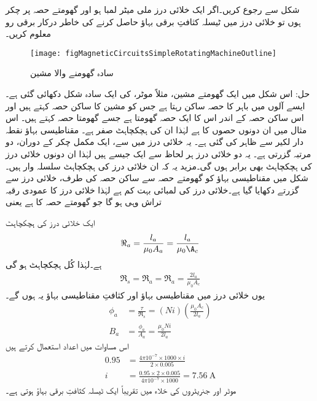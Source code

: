 %
شکل   سے رجوع کریں۔اگر ایک خلائی درز  ملی میٹر لمبا ہو اور گھومتے حصہ پر  چکر ہوں تو خلائی درز میں  ٹیسلہ کثافتِ برقی بہاؤ حاصل کرنے کی خاطر درکار برقی رو معلوم کریں۔
\begin{figure}
\centering
\texttt{[image: figMagneticCircuitsSimpleRotatingMachineOutline]}
\caption{سادہ گھومنے والا مشین}
\label{شکل_مقناطیسی_دور_سادہ_گھومتا_مشین}
\end{figure}
حل:
	 اس شکل میں ایک گھومتے مشین، مثلاً موٹر، کی ایک سادہ شکل دکھائی گئی ہے۔ ایسے آلوں میں باہر کا حصہ ساکن رہتا ہے جس کو مشین کا ساکن حصہ کہتے ہیں اور اس ساکن حصہ کے اندر اس کا ایک حصہ گھومتا ہے جسے گھومتا حصہ کہتے ہیں۔ اس مثال میں ان دونوں حصوں کا    ہے لہٰذا ان کی ہچکچاہٹ صفر ہے۔ مقناطیسی بہاؤ نقطہ دار لکیر سے ظاہر کی گئی ہے۔ یہ خلائی درز میں سے، ایک مکمل چکر کے دوران، دو مرتبہ گزرتی ہے۔ یہ دو خلائی درز ہر لحاظ سے ایک جیسے ہیں لہٰذا ان دونوں خلائی درز کی ہچکچاہٹ بھی برابر ہوں گی۔مزید یہ کہ ان خلائی درز کی ہچکچاہٹ سلسلہ وار ہیں۔شکل میں مقناطیسی بہاؤ کو گھومتے حصہ سے ساکن حصہ کی طرف، خلائی درز سے گزرتے دکھایا گیا ہے۔خلائی درز کی لمبائی  بہت کم ہے لہٰذا خلائی درز کا عمودی رقبہ تراش  وہی ہو گا جو گھومتے حصہ کا ہے یعنی  

  ایک خلائی درز کی ہچکچاہٹ
\begin{align*}
\Re_a=\frac{l_a}{\mu_0 A_a}=\frac{l_a}{\mu_0 \A_c}
\end{align*}
ہے۔لہٰذا کُل ہچکچاہٹ ہو گی
\begin{align*}
\Re_s=\Re_a=\Re_a=\frac{2 l_a}{\mu_0 A_c}
\end{align*}
یوں خلائی درز میں مقناطیسی بہاؤ  اور کثافتِ مقناطیسی بہاؤ  یہ ہوں گے۔
\begin{align*}
\phi_a&=\frac{\tau}{\Re_s}=\left(N i \right) \left (\frac{\mu_0 A_c}{2 l_a} \right)\\
B_a&=\frac{\phi_a}{A_a}=\frac{\mu_0 N i}{2 l_a}
\end{align*}
اس مساوات میں اعداد استعمال کرتے ہیں
\begin{align*}
0.95&=\frac{4 \pi 10^{-7} \times 1000 \times i}{2 \times 0.005}\\
i&=\frac{0.95 \times 2 \times 0.005}{ 4 \pi 10^{-7} \times 1000}=\SI{7.56}{\ampere}
\end{align*}
موٹر اور جنریٹروں کی خلاء میں تقریباً ایک ٹیسلہ کثافتِ برقی بہاؤ ہوتی ہے۔

